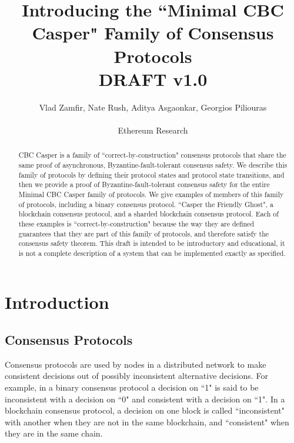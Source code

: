 \documentclass{article}
\theoremstyle{definition}
\begin{document}
\title{Introducing the ``Minimal CBC Casper" Family of Consensus Protocols  \\ \vspace{5mm} \small{DRAFT v1.0}}
\author{Vlad Zamfir, Nate Rush, Aditya Asgaonkar, Georgios Piliouras \\ \\ Ethereum Research}
\maketitle

\begin{abstract}
CBC Casper is a family of ``correct-by-construction" consensus protocols that share the same proof of asynchronous, Byzantine-fault-tolerant consensus safety. We describe this family of protocols by defining their protocol states and protocol state transitions, and then we provide a proof of Byzantine-fault-tolerant consensus safety for the entire Minimal CBC Casper family of protocols. We give examples of members of this family of protocols, including a binary consensus protocol. ``Casper the Friendly Ghost", a blockchain consensus protocol, and a sharded blockchain consensus protocol. Each of these examples is ``correct-by-construction" because the way they are defined guarantees that they are part of this family of protocols, and therefore satisfy the consensus safety theorem. This draft is intended to be introductory and educational, it is not a complete description of a system that can be implemented exactly as specified.
\end{abstract}

\pagebreak
\tableofcontents

\pagebreak
\section{Introduction}

\subsection{Consensus Protocols}

Consensus protocols are used by nodes in a distributed network to make consistent decisions out of possibly inconsistent alternative decisions. For example, in a binary consensus protocol a decision on ``1" is said to be inconsistent with a decision on ``0" and consistent with a decision on ``1". In a blockchain consensus protocol, a decision on one block is called ``inconsistent" with another when they are not in the same blockchain, and ``consistent" when they are in the same chain.
\end{document}

